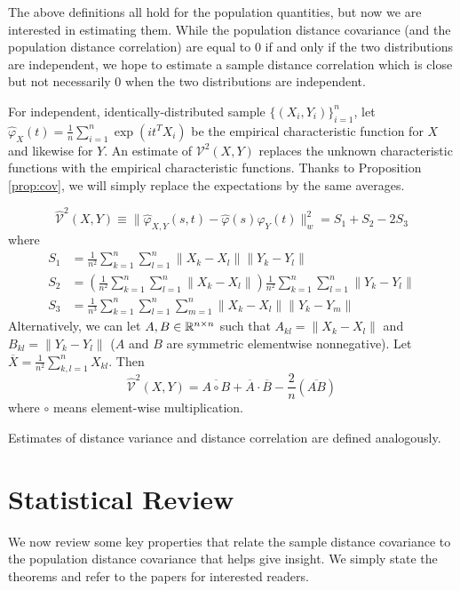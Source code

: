 The above definitions all hold for the population quantities, but now
we are interested in estimating them. While the population distance covariance
(and the population distance correlation) are equal to 0 if and only if
the two distributions are independent, we hope to estimate a sample
distance correlation which is close but not necessarily 0 when the two
distributions are independent.

For independent, identically-distributed sample $\{(X_i, Y_i)\}_{i=1}^n$, let
$\widehat{\varphi}_X (t) = \frac{1}{n} \sum_{i=1}^n \exp(i t^T X_i)$ be
the empirical characteristic function for $X$ and likewise for $Y$. An
estimate of $\mathcal{V}^2(X,Y)$ replaces the unknown characteristic
functions with the empirical characteristic functions. Thanks to Proposition
\ref{prop:cov}, we will simply replace the expectations by the same averages.

\begin{definition}
$$ \widehat{\mathcal{V}}^2 (X,Y) \equiv
\| \widehat{\varphi}_{X,Y}(s,t) - \widehat{\varphi}(s) \widehat{\varphi}_Y(t) \|_w^2 = S_1 + S_2 - 2 S_3 $$
where 
\begin{align*}
S_1 &= \frac{1}{n^2} \sum_{k=1}^n \sum_{l=1}^n \|X_k - X_l\| \|Y_k - Y_l\| \\
S_2 &= \left( \frac{1}{n^2} \sum_{k=1}^n \sum_{l=1}^n \|X_k - X_l\| \right) \frac{1}{n^2} \sum_{k=1}^n \sum_{l=1}^n \|Y_k - Y_l\| \\
S_3 &= \frac{1}{n^3} \sum_{k=1}^n \sum_{l=1}^n \sum_{m=1}^n \|X_k - X_l\| \|Y_k - Y_m\|
\end{align*}
Alternatively, we can let $A, B \in \mathbb{R}^{n \times n}$ such that
$A_{kl} = \|X_k - X_l\|$ and $B_{kl} = \|Y_k - Y_l\|$ ($A$ and $B$ are
symmetric elementwise nonnegative). Let
$\overline{X} = \frac{1}{n^2} \sum_{k,l = 1}^n X_{kl}$. Then
$$ \widehat{\mathcal{V}}^2 (X,Y)
 = \overline{A \circ B} + \overline{A} \cdot \overline{B} - \frac{2}{n}
   (\overline{A B}) $$
where $\circ$ means element-wise multiplication.
\end{definition}


Estimates of distance variance and distance correlation are defined analogously.


\section{Statistical Review}
We now review some key properties that relate the sample distance covariance to
the population distance covariance that helps give insight. We simply state the
theorems and refer to the papers for interested readers.

